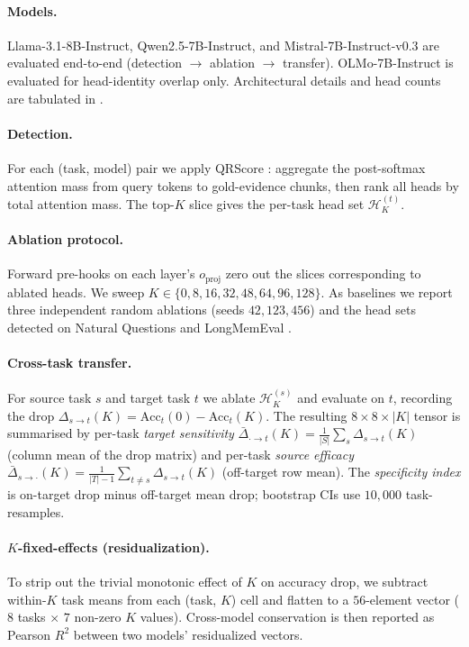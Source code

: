\documentclass{article}
\theoremstyle{plain}
\theoremstyle{definition}
\theoremstyle{remark}
\begin{document}
\paragraph{Models.} Llama-3.1-8B-Instruct, Qwen2.5-7B-Instruct, and Mistral-7B-Instruct-v0.3 are evaluated end-to-end (detection $\to$ ablation $\to$ transfer). OLMo-7B-Instruct is evaluated for head-identity overlap only. Architectural details and head counts are tabulated in .

\paragraph{Detection.} For each (task, model) pair we apply QRScore \citep{zhang2025qrhead}: aggregate the post-softmax attention mass from query tokens to gold-evidence chunks, then rank all heads by total attention mass. The top-$K$ slice gives the per-task head set $\mathcal{H}^{(t)}_K$.

\paragraph{Ablation protocol.} Forward pre-hooks on each layer's $o_{\text{proj}}$ zero out the slices corresponding to ablated heads. We sweep $K \in \{0, 8, 16, 32, 48, 64, 96, 128\}$. As baselines we report three independent random ablations (seeds $42, 123, 456$) and the head sets detected on Natural Questions \citep{kwiatkowski2019nq} and LongMemEval \citep{wu2025lme}.

\paragraph{Cross-task transfer.} For source task $s$ and target task $t$ we ablate $\mathcal{H}^{(s)}_K$ and evaluate on $t$, recording the drop $\Delta_{s\to t}(K) = \text{Acc}_t(0) - \text{Acc}_t(K)$. The resulting $8\times 8\times |K|$ tensor is summarised by per-task \emph{target sensitivity} $\bar{\Delta}_{\cdot\to t}(K) = \tfrac{1}{|S|}\sum_s \Delta_{s\to t}(K)$ (column mean of the drop matrix) and per-task \emph{source efficacy} $\bar{\Delta}_{s\to \cdot}(K) = \tfrac{1}{|T|-1}\sum_{t\neq s}\Delta_{s\to t}(K)$ (off-target row mean). The \emph{specificity index} is on-target drop minus off-target mean drop; bootstrap CIs use $10{,}000$ task-resamples.

\paragraph{$K$-fixed-effects (residualization).} To strip out the trivial monotonic effect of $K$ on accuracy drop, we subtract within-$K$ task means from each (task, $K$) cell and flatten to a $56$-element vector ($8$ tasks $\times$ $7$ non-zero $K$ values). Cross-model conservation is then reported as Pearson $R^2$ between two models' residualized vectors.
\end{document}

